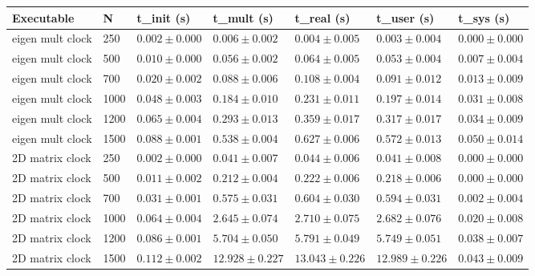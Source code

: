 \begin{table}[h!]   
    \centering
    \begin{tabular}{|l|l|l|l|l|l|l|}    
        \hline
        \textbf{Executable} & \textbf{N} & \textbf{t\_init (s)} & \textbf{t\_mult (s)} & \textbf{t\_real (s)} & \textbf{t\_user (s)} & \textbf{t\_sys (s)} \\
        \hline
        eigen mult clock    & 250   & \(0.002 \pm 0.000\) & \(0.006 \pm 0.002\) & \(0.004 \pm 0.005\) & \(0.003 \pm 0.004\) & \(0.000 \pm 0.000\) \\
        eigen mult clock    & 500   & \(0.010 \pm 0.000\) & \(0.056 \pm 0.002\) & \(0.064 \pm 0.005\) & \(0.053 \pm 0.004\) & \(0.007 \pm 0.004\) \\
        eigen mult clock    & 700   & \(0.020 \pm 0.002\) & \(0.088 \pm 0.006\) & \(0.108 \pm 0.004\) & \(0.091 \pm 0.012\) & \(0.013 \pm 0.009\) \\
        eigen mult clock    & 1000  & \(0.048 \pm 0.003\) & \(0.184 \pm 0.010\) & \(0.231 \pm 0.011\) & \(0.197 \pm 0.014\) & \(0.031 \pm 0.008\) \\
        eigen mult clock    & 1200  & \(0.065 \pm 0.004\) & \(0.293 \pm 0.013\) & \(0.359 \pm 0.017\) & \(0.317 \pm 0.017\) & \(0.034 \pm 0.009\) \\
        eigen mult clock    & 1500  & \(0.088 \pm 0.001\) & \(0.538 \pm 0.004\) & \(0.627 \pm 0.006\) & \(0.572 \pm 0.013\) & \(0.050 \pm 0.014\) \\
        2D matrix clock     & 250   & \(0.002 \pm 0.000\) & \(0.041 \pm 0.007\) & \(0.044 \pm 0.006\) & \(0.041 \pm 0.008\) & \(0.000 \pm 0.000\) \\
        2D matrix clock     & 500   & \(0.011 \pm 0.002\) & \(0.212 \pm 0.004\) & \(0.222 \pm 0.006\) & \(0.218 \pm 0.006\) & \(0.000 \pm 0.000\) \\
        2D matrix clock     & 700   & \(0.031 \pm 0.001\) & \(0.575 \pm 0.031\) & \(0.604 \pm 0.030\) & \(0.594 \pm 0.031\) & \(0.002 \pm 0.004\) \\
        2D matrix clock     & 1000  & \(0.064 \pm 0.004\) & \(2.645 \pm 0.074\) & \(2.710 \pm 0.075\) & \(2.682 \pm 0.076\) & \(0.020 \pm 0.008\) \\
        2D matrix clock     & 1200  & \(0.086 \pm 0.001\) & \(5.704 \pm 0.050\) & \(5.791 \pm 0.049\) & \(5.749 \pm 0.051\) & \(0.038 \pm 0.007\) \\
        2D matrix clock     & 1500  & \(0.112 \pm 0.002\) & \(12.928 \pm 0.227\) & \(13.043 \pm 0.226\) & \(12.989 \pm 0.226\) & \(0.043 \pm 0.009\) \\
        \hline 
    \end{tabular}
\end{table}


